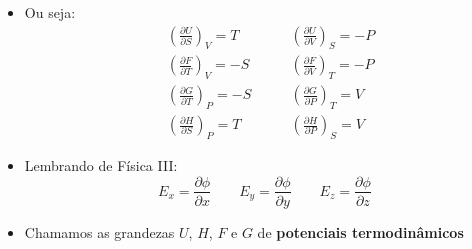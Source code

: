 \documentclass[t,%
brazilian,%
11pt,%
aspectratio=169,%
table%
]{beamer}
\begin{document}
\begin{frame}
    \begin{itemize}
        \item Ou seja:
            \begin{align*}
                    & \left(\frac{\partial U}{\partial S}\right)_V = T \qquad & \left(\frac{\partial U}{\partial V}\right)_S = -P \\
                    & \left(\frac{\partial F}{\partial T}\right)_V = -S \qquad & \left(\frac{\partial F}{\partial V}\right)_T = -P \\
                    & \left(\frac{\partial G}{\partial T}\right)_P = -S \qquad & \left(\frac{\partial G}{\partial P}\right)_T = V \\
                    & \left(\frac{\partial H}{\partial S}\right)_P = T \qquad & \left(\frac{\partial H}{\partial P}\right)_S = V
            \end{align*}
        \item Lembrando de Física III:
            \[
                E_x = \frac{\partial \phi}{\partial x} \qquad
                E_y = \frac{\partial \phi}{\partial y} \qquad
                E_z = \frac{\partial \phi}{\partial z} 
            \]
        \item Chamamos as grandezas \(U\), \(H\), \(F\) e \(G\) de \textbf{potenciais termodinâmicos}
    \end{itemize}
\end{frame}

\end{document}
